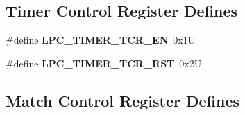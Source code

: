 \subsection*{Timer Control Register Defines}
\begin{DoxyCompactItemize}
\item 
\mbox{\label{group__lpc__timer_ga42ae540c1ba32f3cb02ad9ce0d24f415}} 
\#define {\bfseries L\+P\+C\+\_\+\+T\+I\+M\+E\+R\+\_\+\+T\+C\+R\+\_\+\+EN}~0x1U
\item 
\mbox{\label{group__lpc__timer_ga3e7edc719c981cde9696ca87c117c31a}} 
\#define {\bfseries L\+P\+C\+\_\+\+T\+I\+M\+E\+R\+\_\+\+T\+C\+R\+\_\+\+R\+ST}~0x2U
\end{DoxyCompactItemize}
\subsection*{Match Control Register Defines}
